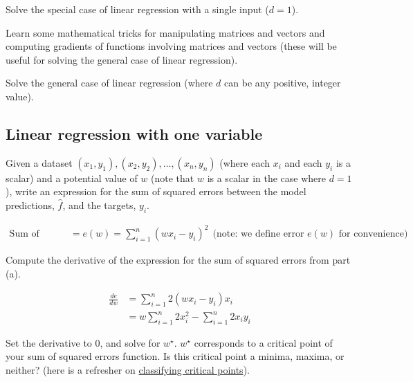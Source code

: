 \documentclass[assignment02_Solutions]{subfiles}
\begin{document}
\be
\item Solve the special case of linear regression with a single input ($d=1$).
\item Learn some mathematical tricks for manipulating matrices and vectors and computing gradients of functions involving matrices and vectors (these will be useful for solving the general case of linear regression).
\item Solve the general case of linear regression (where $d$ can be any positive, integer value).
\ee

\subsection{Linear regression with one variable}

\begin{exercise}[(10 minutes)]
\bes
\item Given a dataset $(x_1, y_1), (x_2, y_2), \ldots, (x_n, y_n)$ (where each $x_i$ and each $y_i$ is a scalar) and a potential value of $w$ (note that $w$ is a scalar in the case where $d=1$), write an expression for the sum of squared errors between the model predictions, $\hat{f}$, and the targets, $y_i$.

\begin{boxedsolution}
\begin{align}
\mbox{Sum of Squared Errors} &= e(w) = \sum_{i=1}^n \left (  w x_i - y_i \right)^2~~\mbox{(note: we define error $e(w)$ for convenience)}
\end{align}
\end{boxedsolution}

\item Compute the derivative of the expression for the sum of squared errors from part (a).

\begin{boxedsolution}
\begin{align}
\frac{de}{dw} & = \sum_{i=1}^n 2 \left (  w x_i - y_i \right)x_i  \\
&= w \sum_{i=1}^n 2 x_i^2 - \sum_{i=1}^n 2 x_i y_i
\end{align}
\end{boxedsolution}

\item Set the derivative to 0, and solve for $w^\star$.  $w^\star$ corresponds to a critical point of your sum of squared errors function.  Is this critical point a minima, maxima, or neither? (here is a refresher on \href{http://homes.sice.indiana.edu/donbyrd/Teach/M119WebPage/Finding+ClassifyingCriticalPoints.pdf}{classifying critical points}).
 

\end{exercise}
\end{document}
